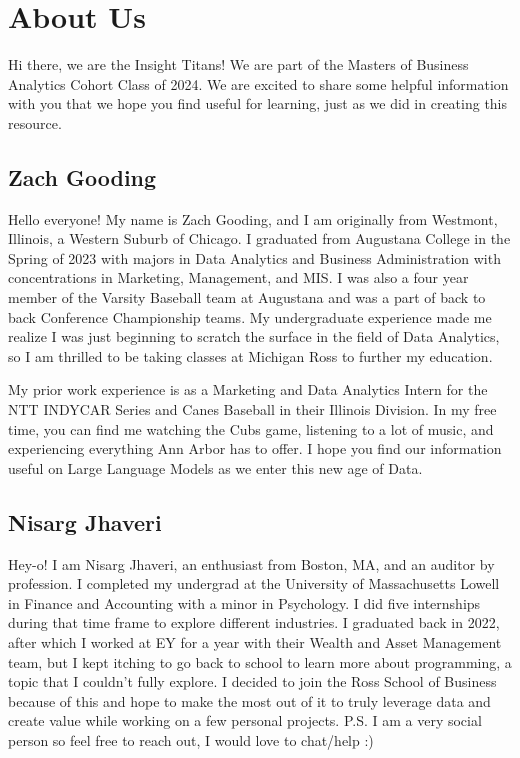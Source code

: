 \documentclass[
]{book}
\begin{document}
\hypertarget{about-us}{%
\chapter{About Us}\label{about-us}}

Hi there, we are the Insight Titans! We are part of the Masters of Business Analytics Cohort Class of 2024. We are excited to share some helpful information with you that we hope you find useful for learning, just as we did in creating this resource.

\hypertarget{zach-gooding}{%
\section{Zach Gooding}\label{zach-gooding}}

Hello everyone! My name is Zach Gooding, and I am originally from Westmont, Illinois, a Western Suburb of Chicago. I graduated from Augustana College in the Spring of 2023 with majors in Data Analytics and Business Administration with concentrations in Marketing, Management, and MIS. I was also a four year member of the Varsity Baseball team at Augustana and was a part of back to back Conference Championship teams. My undergraduate experience made me realize I was just beginning to scratch the surface in the field of Data Analytics, so I am thrilled to be taking classes at Michigan Ross to further my education.

My prior work experience is as a Marketing and Data Analytics Intern for the NTT INDYCAR Series and Canes Baseball in their Illinois Division. In my free time, you can find me watching the Cubs game, listening to a lot of music, and experiencing everything Ann Arbor has to offer. I hope you find our information useful on Large Language Models as we enter this new age of Data.

\hypertarget{nisarg-jhaveri}{%
\section{Nisarg Jhaveri}\label{nisarg-jhaveri}}

Hey-o! I am Nisarg Jhaveri, an enthusiast from Boston, MA, and an auditor by profession. I completed my undergrad at the University of Massachusetts Lowell in Finance and Accounting with a minor in Psychology. I did five internships during that time frame to explore different industries. I graduated back in 2022, after which I worked at EY for a year with their Wealth and Asset Management team, but I kept itching to go back to school to learn more about programming, a topic that I couldn't fully explore.
I decided to join the Ross School of Business because of this and hope to make the most out of it to truly leverage data and create value while working on a few personal projects.
P.S. I am a very social person so feel free to reach out, I would love to chat/help :)
\end{document}
